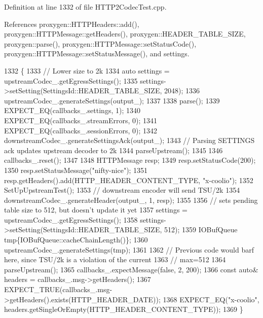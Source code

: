 Definition at line 1332 of file H\+T\+T\+P2\+Codec\+Test.\+cpp.



References proxygen\+::\+H\+T\+T\+P\+Headers\+::add(), proxygen\+::\+H\+T\+T\+P\+Message\+::get\+Headers(), proxygen\+::\+H\+E\+A\+D\+E\+R\+\_\+\+T\+A\+B\+L\+E\+\_\+\+S\+I\+ZE, proxygen\+::parse(), proxygen\+::\+H\+T\+T\+P\+Message\+::set\+Status\+Code(), proxygen\+::\+H\+T\+T\+P\+Message\+::set\+Status\+Message(), and settings.


\begin{DoxyCode}
1332                                                      \{
1333   \textcolor{comment}{// Lower size to 2k}
1334   \textcolor{keyword}{auto} settings = upstreamCodec\_.getEgressSettings();
1335   settings->setSetting(SettingsId::HEADER\_TABLE\_SIZE, 2048);
1336   upstreamCodec\_.generateSettings(output\_);
1337 
1338   parse();
1339   EXPECT\_EQ(callbacks\_.settings, 1);
1340   EXPECT\_EQ(callbacks\_.streamErrors, 0);
1341   EXPECT\_EQ(callbacks\_.sessionErrors, 0);
1342   downstreamCodec\_.generateSettingsAck(output\_);
1343   \textcolor{comment}{// Parsing SETTINGS ack updates upstream decoder to 2k}
1344   parseUpstream();
1345 
1346   callbacks\_.reset();
1347 
1348   HTTPMessage resp;
1349   resp.setStatusCode(200);
1350   resp.setStatusMessage(\textcolor{stringliteral}{"nifty-nice"});
1351   resp.getHeaders().add(HTTP\_HEADER\_CONTENT\_TYPE, \textcolor{stringliteral}{"x-coolio"});
1352   SetUpUpstreamTest();
1353   \textcolor{comment}{// downstream encoder will send TSU/2k}
1354   downstreamCodec\_.generateHeader(output\_, 1, resp);
1355 
1356   \textcolor{comment}{// sets pending table size to 512, but doesn't update it yet}
1357   settings = upstreamCodec\_.getEgressSettings();
1358   settings->setSetting(SettingsId::HEADER\_TABLE\_SIZE, 512);
1359   IOBufQueue tmp\{IOBufQueue::cacheChainLength()\};
1360   upstreamCodec\_.generateSettings(tmp);
1361 
1362   \textcolor{comment}{// Previous code would barf here, since TSU/2k is a violation of the current}
1363   \textcolor{comment}{// max=512}
1364   parseUpstream();
1365   callbacks\_.expectMessage(\textcolor{keyword}{false}, 2, 200);
1366   \textcolor{keyword}{const} \textcolor{keyword}{auto}& headers = callbacks\_.msg->getHeaders();
1367   EXPECT\_TRUE(callbacks\_.msg->getHeaders().exists(HTTP\_HEADER\_DATE));
1368   EXPECT\_EQ(\textcolor{stringliteral}{"x-coolio"}, headers.getSingleOrEmpty(HTTP\_HEADER\_CONTENT\_TYPE));
1369 \}
\end{DoxyCode}
